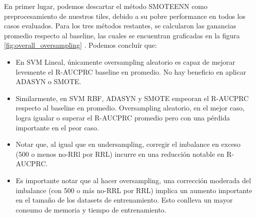 En primer lugar, podemos descartar el método SMOTEENN como preprocesamiento de nuestros tiles, debido a su pobre performance en todos los casos evaluados. Para los tres métodos restantes, se calcularon las ganancias promedio respecto al baseline, las cuales se encuentran graficadas en la figura \ref{fig:overall_oversampling} . Podemos concluír que:
\begin{itemize}
\item En SVM Lineal, únicamente oversampling aleatorio es capaz de mejorar levemente el R-AUCPRC baseline en promedio. No hay beneficio en aplicar ADASYN o SMOTE.
\item Similarmente, en SVM RBF, ADASYN y SMOTE empeoran el R-AUCPRC respecto al baseline en promedio. Oversampling aleatorio, en el mejor caso, logra igualar o superar el R-AUCPRC promedio pero con una pérdida importante en el peor caso.
\item Notar que, al igual que en undersampling, corregir el imbalance en exceso (500 o menos no-RRl por RRL) incurre en una reducción notable en R-AUCPRC.
\item Es importante notar que al hacer oversampling, una corrección moderada del imbalance (con 500 o más no-RRL por RRL) implica un aumento importante en el tamaño de los datasets de entrenamiento. Esto conlleva un mayor consumo de memoria y tiempo de entrenamiento.
\end{itemize}

